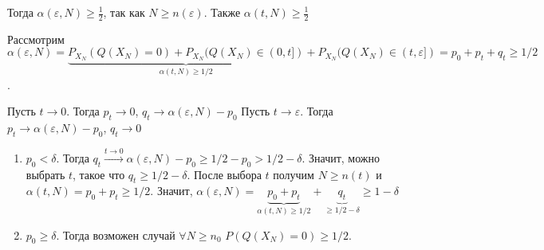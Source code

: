 \documentclass[a4paper]{article}
\def\eps{\varepsilon}
\begin{document}
\begin{enumerate}
Тогда $\alpha(\eps, N)\geqslant\frac{1}{2}$, так как $N\geqslant n(\eps)$. Также $\alpha(t,N)\geqslant \frac{1}{2}$

Рассмотрим $\alpha(\eps, N)=\underbrace{P_{X_N}(Q(X_N)=0)+P_{X_N}(Q(X_N)\in(0,t])}_{\alpha(t,N)\geqslant1/2}+P_{X_N}(Q(X_N)\in(t,\eps])=p_0+p_t+q_t\geqslant 1/2$.

Пусть $t\to 0$. Тогда $p_t\to 0$, $q_t\to\alpha(\eps, N)-p_0$
Пусть $t\to\eps$. Тогда $p_t\to \alpha(\eps, N)-p_0$, $q_t\to 0$

\begin{enumerate}
\item $p_0<\delta$. Тогда $q_t\overset{t\to 0}{\longrightarrow}\alpha(\eps, N)-p_0\geqslant1/2-p_0>1/2-\delta$. Значит, можно выбрать $t$, такое что $q_t\geqslant 1/2-\delta$. После выбора $t$ получим $N\geqslant n(t)$ и $\alpha(t,N)=p_0+p_t\geqslant 1/2$. Значит, $\alpha(\eps, N)=\underbrace{p_0+p_t}_{\alpha(t,N)\geqslant 1/2}+\underbrace{q_t}_{\geqslant 1/2-\delta}\geqslant 1-\delta$
\item $p_0\geqslant\delta$. Тогда возможен случай $\forall N\geqslant n_0$ $P(Q(X_N)=0)\geqslant 1/2$. 
\end{enumerate}
\end{enumerate}
\end{document}
